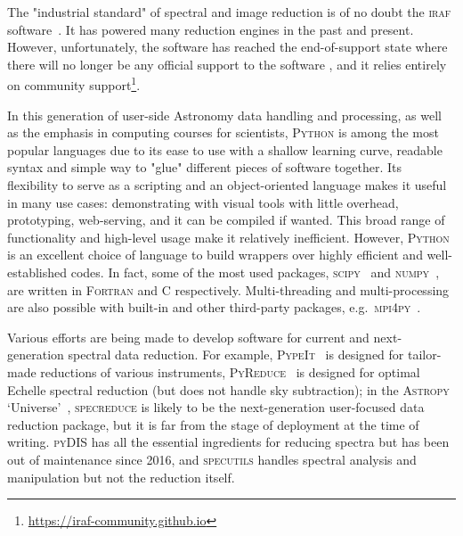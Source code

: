 \documentclass[fleqn,usenatbib]{mnras}
\begin{document}
The "industrial standard" of spectral and image reduction is of no doubt the
\textsc{iraf} software~\citep{1986SPIE..627..733T, 1993ASPC...52..173T}. It has powered many
reduction engines in the past and present. However, unfortunately, the software has reached
the end-of-support state where there will no longer be any official support to the software
, and it relies entirely on community support\footnote{\url{https://iraf-community.github.io}}.

In this generation of user-side Astronomy data handling and processing, as well as the emphasis in
computing courses for scientists, \textsc{Python} is among the most popular languages due to
its ease to use with a shallow learning curve, readable syntax and simple way to "glue"
different pieces of software together. Its flexibility to serve as a scripting and an
object-oriented language makes it useful in many use cases: demonstrating with visual tools
with little overhead, prototyping, web-serving, and it can be compiled if wanted. This broad range of
functionality and high-level usage make it relatively inefficient. However, \textsc{Python}
is an excellent choice of language to build wrappers over highly efficient and well-established
codes. In fact, some of the most used packages,
\textsc{scipy}~\citep{2020SciPy-NMeth} and \textsc{numpy}~\citep{2020NumPy-Array},
are written in \textsc{Fortran} and \textsc{C} respectively. Multi-threading and multi-processing
are also possible with built-in and other third-party packages, e.g.\ \textsc{mpi4py}~\citep{DALCIN20111124}. 

Various efforts are being made to develop software for current and next-generation 
spectral data reduction. For example, \textsc{PypeIt}~\citep{pypeit:zenodo, pypeit:joss_pub}
is designed for tailor-made reductions of various instruments, \textsc{PyReduce}~\citep{2021A&A...646A..32P}
is designed for optimal Echelle spectral reduction (but does not handle sky subtraction);
in the \textsc{Astropy} `Universe'~\citep{astropy:2013, astropy:2018}, \textsc{specreduce}
is likely to be the next-generation user-focused data reduction package, but it is far from
the stage of deployment at the time of writing. \textsc{pyDIS} has all the essential
ingredients for reducing spectra but has been out of maintenance since 2016, and \textsc{specutils}
handles spectral analysis and manipulation but not the reduction itself.
\end{document}
